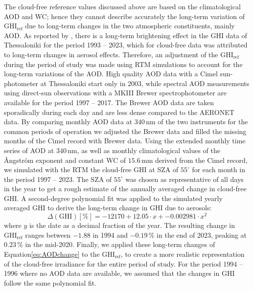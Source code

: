 \documentclass[preprint, 5p,
authoryear]{elsarticle} %
\begin{document}
The cloud-free reference values discussed above are based on the
climatological AOD and WC; hence they cannot describe accurately the
long-term variation of \(\text{GHI}_\text{ref}\) due to long-term
changes in the two atmospheric constituents, mainly AOD. As reported by
\citet{Natsis2023}, there is a long-term brightening effect in the GHI
data of Thessaloniki for the period 1993 -- 2023, which for cloud-free
data was attributed to long-term changes in aerosol effects. Therefore,
an adjustment of the \(\text{GHI}_\text{ref}\) during the period of
study was made using RTM simulations to account for the long-term
variations of the AOD. High quality AOD data with a Cimel sun-photometer
at Thessaloniki start only in 2003, while spectral AOD measurements
using direct-sun observations with a MKIII Brewer spectrophotometer are
available for the period 1997 -- 2017. The Brewer AOD data are taken
sporadically during each day and are less dense compared to the AERONET
data. By comparing monthly AOD data at \(340\,\text{nm}\) of the two
instruments for the common periods of operation we adjusted the Brewer
data and filled the missing months of the Cimel record with Brewer data.
Using the extended monthly time series of AOD at \(340\,\text{nm}\), as
well as monthly climatological values of the Ångström exponent and
constant WC of \(15.6\,\text{mm}\) derived from the Cimel record, we
simulated with the RTM the cloud-free GHI at SZA of \(55^\circ\) for
each month in the period 1997 -- 2023. The SZA of \(55^\circ\) was
chosen as representative of all days in the year to get a rough estimate
of the annually averaged change in cloud-free GHI. A second-degree
polynomial fit was applied to the simulated yearly averaged GHI to
derive the long-term change in GHI due to aerosols: \begin{equation}
\Delta(\text{GHI}) [\%] = -12170 + 12.05 \cdot x + -0.002981 \cdot x^2 \label{eq:AODchange}
\end{equation} where \(y\) is the date as a decimal fraction of the
year. The resulting change in \(\text{GHI}_\text{ref}\) ranges between
\(-1.88\) in 1994 and \(-0.19\,\%\) in the end of 2023, peaking at
\(0.23\,\%\) in the mid-2020. Finally, we applied these long-term
changes of Equation\nobreakspace{}\ref{eq:AODchange} to the
\(\text{GHI}_\text{ref}\), to create a more realistic representation of
the cloud-free irradiance for the entire period of study. For the period
1994 -- 1996 where no AOD data are available, we assumed that the
changes in GHI follow the same polynomial fit.
\end{document}
